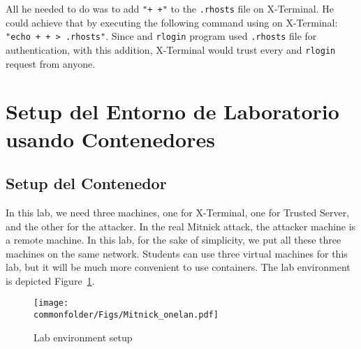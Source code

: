 All he needed to do was to add  
\texttt{"+ +"} to the \texttt{.rhosts} file on X-Terminal.
He could achieve that
by executing the following command using \rsh on X-Terminal: 
{\tt "echo + + > .rhosts"}. 
Since \rsh and \texttt{rlogin} program used
\texttt{.rhosts} file for authentication, with this addition, 
X-Terminal would trust every
\rsh and \texttt{rlogin} request from anyone. 



\section{Setup del Entorno de Laboratorio usando Contenedores}



\subsection{Setup del Contenedor}

In this lab, we need three machines, 
one for X-Terminal, one for Trusted Server, and the other for the attacker. 
In the real Mitnick attack, the attacker machine is a remote machine. 
In this lab, for the 
sake of simplicity, we put all these three machines on the same network. 
Students can use three virtual
machines for this lab, but it will be much more convenient to
use containers. The lab environment is depicted 
Figure~\ref{mitnick:fig:labsetup}.



\begin{figure}[htb]
\begin{center}
\texttt{[image: \\commonfolder/Figs/Mitnick\_onelan.pdf]}
\end{center}
\caption{Lab environment setup}
\label{mitnick:fig:labsetup}
\end{figure}
 

%



